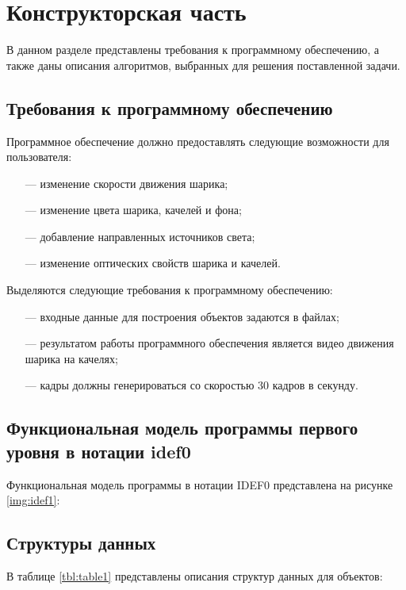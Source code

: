 \chapter{Конструкторская часть}

В данном разделе представлены требования к программному обеспечению, а также даны описания алгоритмов, выбранных для решения поставленной задачи.

\section{Требования к программному обеспечению}

Программное обеспечение должно предоставлять следующие возможности для пользователя:
\begin{itemize}
	\item[---] изменение скорости движения шарика;
	\item[---] изменение цвета шарика, качелей и фона;
	\item[---] добавление направленных источников света;
	\item[---] изменение оптических свойств шарика и качелей.
\end{itemize}

Выделяются следующие требования к программному обеспечению:
\begin{itemize}
	\item[---] входные данные для построения объектов задаются в файлах;
	\item[---] результатом работы программного обеспечения является видео движения шарика на качелях;
	\item[---] кадры должны генерироваться со скоростью 30 кадров в секунду.
\end{itemize}

\section{Функциональная модель программы первого уровня в нотации idef0}

Функциональная модель программы в нотации IDEF0 представлена на рисунке \ref{img:idef1}:

\pagebreak

\section{Структуры данных}

В таблице \ref{tbl:table1} представлены описания структур данных для объектов:

